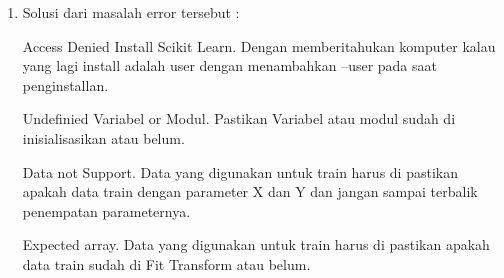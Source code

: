 \begin{enumerate}
\item
Solusi dari masalah error tersebut :
\par
Access Denied Install Scikit Learn. Dengan memberitahukan komputer kalau yang lagi install adalah user dengan menambahkan --user pada saat penginstallan.
\par
Undefinied Variabel or Modul. Pastikan Variabel atau modul sudah di inisialisasikan atau belum.
\par
Data not Support. Data yang digunakan untuk train harus di pastikan apakah data train dengan parameter X dan Y dan jangan sampai terbalik penempatan parameternya.
\par
Expected array. Data yang digunakan untuk train harus di pastikan apakah data train sudah di Fit Transform atau belum.

\end{enumerate}
